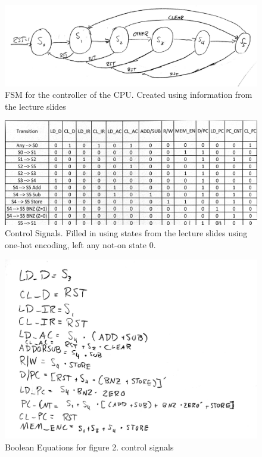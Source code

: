 \documentclass[12pt]{article}
\begin{document}
		\begin{figure}[h]
			\includegraphics[scale=.18]{Prelab1.jpg}
			\caption{FSM for the controller of the CPU. Created using information from the lecture slides}
		\end{figure}
		\begin{figure}[h]
			\includegraphics[scale=.15]{Prelab2.jpg}
			\caption{Control Signals. Filled in using states from the lecture slides using one-hot encoding, left any not-on state 0.}
		\end{figure}
		\newpage
		\begin{figure}[h]
			\includegraphics[scale=.13]{Prelab3.jpg}
			\caption{Boolean Equations for figure 2. control signals}
		\end{figure} 
\end{document}
